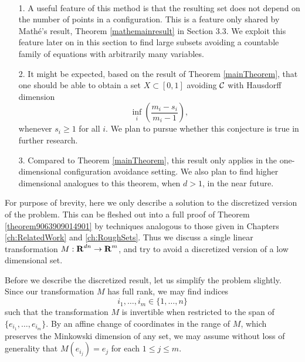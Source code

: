 \begin{remarks}
    \
    \begin{enumerate}
        \item[1.] A useful feature of this method is that the resulting set does not depend on the number of points in a configuration. This is a feature only shared by Math\'{e}'s result, Theorem \ref{mathemainresult} in Section 3.3. We exploit this feature later on in this section to find large subsets avoiding a countable family of equations with arbitrarily many variables.

        \item[2.] It might be expected, based on the result of Theorem \ref{mainTheorem}, that one should be able to obtain a set $X \subset [0,1]$ avoiding $\operatorname{\mathcal{C}}$ with Hausdorff dimension
        \[ \inf_i \left( \frac{m_i - s_i}{m_i - 1} \right), \]
        whenever $s_i \geq 1$ for all $i$. We plan to pursue whether this conjecture is true in further research.

        \item[3.] Compared to Theorem \ref{mainTheorem}, this result only applies in the one-dimensional configuration avoidance setting. We also plan to find higher dimensional analogues to this theorem, when $d > 1$, in the near future.
    \end{enumerate}
\end{remarks}

For purpose of brevity, here we only describe a solution to the discretized version of the problem. This can be fleshed out into a full proof of Theorem \ref{theorem9063909014901} by techniques analogous to those given in Chapters \ref{ch:RelatedWork} and \ref{ch:RoughSets}. Thus we discuss a single linear transformation $M: \operatorname{\mathbf{R}}^{dn} \to \operatorname{\mathbf{R}}^m$, and try to avoid a discretized version of a low dimensional set.

Before we describe the discretized result, let us simplify the problem slightly. Since our transformation $M$ has full rank, we may find indices
%
\[ i_1, \dots, i_m \in \{ 1, \dots, n \} \]
%
such that the transformation $M$ is invertible when restricted to the span of $\{ e_{i_1}, \dots, e_{i_m} \}$. By an affine change of coordinates in the range of $M$, which preserves the Minkowski dimension of any set, we may assume without loss of generality that $M(e_{i_j}) = e_j$ for each $1 \leq j \leq m$.

